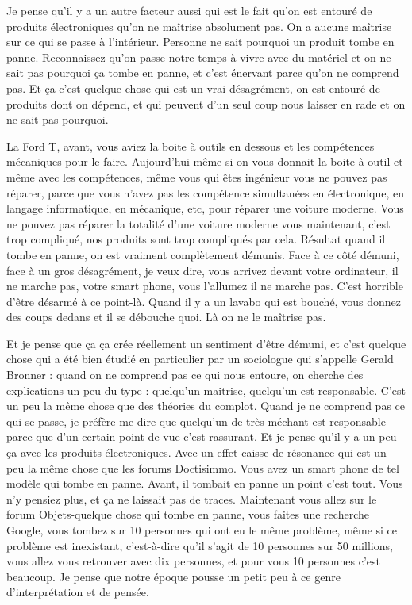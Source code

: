 \begin{small}
Je pense qu'il y a un autre facteur aussi qui est le fait qu'on est entouré de produits électroniques qu'on ne maîtrise absolument pas. On a aucune maîtrise sur ce qui se passe à l'intérieur. Personne ne sait pourquoi un produit tombe en panne. Reconnaissez qu'on passe notre temps à vivre avec du matériel et on ne sait pas pourquoi ça tombe en panne, et c'est énervant parce qu'on ne comprend pas. Et ça c'est quelque chose qui est un vrai désagrément, on est entouré de produits dont on dépend, et qui peuvent d'un seul coup nous laisser en rade et on ne sait pas pourquoi. 

La Ford T, avant, vous aviez la boite à outils en dessous et les compétences mécaniques pour le faire. Aujourd'hui même si on vous donnait la boite à outil et même avec les compétences, même vous qui êtes ingénieur vous ne pouvez pas réparer, parce que vous n'avez pas les compétence simultanées en  électronique, en langage informatique, en mécanique, etc, pour réparer une voiture moderne. Vous ne pouvez pas réparer la totalité d'une voiture moderne vous maintenant, c'est trop compliqué, nos produits sont trop compliqués par cela. Résultat quand il tombe en panne, on est vraiment complètement démunis. Face à ce côté démuni, face à un gros désagrément, je veux dire, vous arrivez devant votre ordinateur, il ne marche pas, votre smart phone, vous l'allumez il ne marche pas. C'est horrible d'être désarmé à ce point-là. Quand il y a un lavabo qui est bouché, vous donnez des coups dedans et il se débouche quoi. Là on ne le maîtrise pas. 

Et je pense que ça ça crée réellement un sentiment d'être démuni, et c'est quelque chose qui a été bien étudié en particulier par un sociologue qui s'appelle Gerald Bronner : quand on ne comprend pas ce qui nous entoure, on cherche des explications un peu du type : quelqu'un maitrise, quelqu'un est responsable. C'est un peu la même chose que des théories du complot. Quand je ne comprend pas ce qui se passe, je préfère me dire que quelqu'un de très méchant est responsable parce que d'un certain point de vue c'est rassurant. Et je pense qu'il y a un peu ça avec les produits électroniques. Avec un effet caisse de résonance qui est un peu la même chose que les forums Doctisimmo. Vous avez un smart phone de tel modèle qui tombe en panne. Avant, il tombait en panne un point c'est tout. Vous n'y pensiez plus, et ça ne laissait pas de traces. Maintenant vous allez sur le forum Objets-quelque chose qui tombe en panne, vous faites une recherche Google, vous tombez sur 10 personnes qui ont eu le même problème, même si ce problème est inexistant, c'est-à-dire qu'il s'agit de 10 personnes sur 50 millions, vous allez vous retrouver avec dix personnes, et pour vous 10 personnes c'est beaucoup. Je pense que notre époque pousse un petit peu à ce genre d'interprétation et de pensée. 


\end{small}
